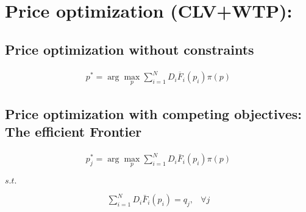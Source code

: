 \chapter{Price optimization (CLV+WTP): }
\section{Price optimization without constraints}
\begin{align}
p^*= \arg \max_p \sum_{i=1}^N D_i\overline{F}_i(p_i)\pi(p)
\end{align}

\section{Price optimization with competing objectives: The efficient Frontier}

\begin{align}
p^*_j= \arg \max_p \sum_{i=1}^N D_i\bar{F}_i(p_i)\pi(p)
\end{align}
\begin{center}
    $s.t.$
\end{center}
\begin{align}
\sum_{i=1}^N D_i\bar{F}_i(p_i) =q_j,& \forall j
\end{align}
